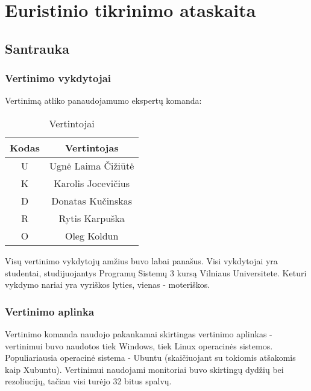 \section{Euristinio tikrinimo ataskaita}

\subsection{Santrauka}

	\subsubsection{Vertinimo vykdytojai}

	Vertinimą atliko panaudojamumo ekspertų komanda:
	\begin{table}[ht] 
		\caption{Vertintojai} %
		\centering %
		\begin{tabular}{c c} %
			\hline\hline %
			Kodas & Vertintojas\\ [0.5pt] %
			\hline %
			U & Ugnė Laima Čižiūtė\\
			K & Karolis Jocevičius\\
			D & Donatas Kučinskas\\
			R & Rytis Karpuška\\
			O & Oleg Koldun
			\hline %
		\end{tabular} 
		\label{table:vertintojai} %
	\end{table} 

	Visų vertinimo vykdytojų amžius buvo labai panašus.
	Visi vykdytojai yra studentai, studijuojantys Programų Sistemų 3 kursą Vilniaus Universitete.
	Keturi vykdymo nariai yra vyriškos lyties, vienas - moteriškos.

	\subsubsection{Vertinimo aplinka}

	Vertinimo komanda naudojo pakankamai skirtingas vertinimo aplinkas - vertinimui buvo naudotos tiek Windows, tiek Linux operacinės sistemos.
	Populiariausia operacinė sistema - Ubuntu (skaičiuojant su tokiomis atšakomis kaip Xubuntu).
	Vertinimui naudojami monitoriai buvo skirtingų dydžių bei rezoliucijų, tačiau visi turėjo 32 bitus spalvų.

